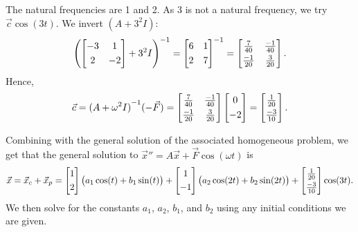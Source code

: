 \begin{example}
The natural frequencies are 1 and 2.  As 3 is not a
natural frequency, we try $\vec{c} \cos (3t)$.
We invert $(A+3^2 I)$:
\begin{equation*}
{\left( \begin{bmatrix}
-3 & 1 \\
\noalign{\smallskip}
2 & -2
\end{bmatrix}
+3^2 I\right)}^{-1}
=
{\begin{bmatrix}
6 & 1 \\
\noalign{\smallskip}
2 & 7
\end{bmatrix}}^{-1}
=
\begin{bmatrix}
\frac{7}{40} & \frac{-1}{40} \\
\noalign{\smallskip}
\frac{-1}{20} & \frac{3}{20}
\end{bmatrix} .
\end{equation*}
Hence,
\begin{equation*}
\vec{c} = 
{(A +\omega^2 I)}^{-1}
(-\vec{F} ) = 
\begin{bmatrix}
\frac{7}{40} & \frac{-1}{40} \\
\noalign{\smallskip}
\frac{-1}{20} & \frac{3}{20}
\end{bmatrix}
\begin{bmatrix}
0 \\
\noalign{\smallskip}
-2
\end{bmatrix}
=
\begin{bmatrix}
\frac{1}{20} \\
\noalign{\smallskip}
\frac{-3}{10}
\end{bmatrix} .
\end{equation*}

Combining with the general solution of the associated
homogeneous problem, we get that the general solution to
${\vec{x}}'' = A \vec{x} + \vec{F} \cos (\omega t)$ is
\begin{equation*}
\vec{x} = \vec{x}_c + \vec{x}_p =
\begin{bmatrix} 1 \\
\noalign{\smallskip}
2 \end{bmatrix}
\bigl( a_1 \cos (t) + b_1 \sin (t) \bigr)
+
\begin{bmatrix} 1 \\
\noalign{\smallskip}
-1 \end{bmatrix}
\bigl( a_2 \cos (2t) + b_2 \sin (2t) \bigr)
+
\begin{bmatrix}
\frac{1}{20} \\
\noalign{\smallskip}
\frac{-3}{10}
\end{bmatrix}
\cos (3t) .
\end{equation*}
We then solve for the constants
$a_1$, $a_2$, $b_1$, and $b_2$ using
any initial conditions we are given.
\end{example}

